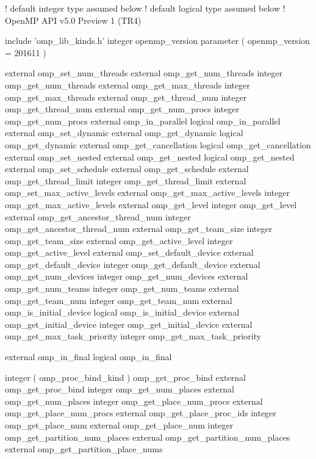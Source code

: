 {\small \begin{codepar}
! default integer type assumed below
! default logical type assumed below
! OpenMP API v5.0 Preview 1 (TR4)

     include 'omp\_lib\_kinds.h'
     integer openmp\_version
     parameter ( openmp\_version = 201611 )

     external omp\_set\_num\_threads
     external omp\_get\_num\_threads
     integer omp\_get\_num\_threads
     external omp\_get\_max\_threads
     integer omp\_get\_max\_threads
     external omp\_get\_thread\_num
     integer omp\_get\_thread\_num
     external omp\_get\_num\_procs
     integer omp\_get\_num\_procs
     external omp\_in\_parallel
     logical omp\_in\_parallel
     external omp\_set\_dynamic
     external omp\_get\_dynamic
     logical omp\_get\_dynamic
     external omp\_get\_cancellation
     logical omp\_get\_cancellation
     external omp\_set\_nested
     external omp\_get\_nested
     logical omp\_get\_nested
     external omp\_set\_schedule
     external omp\_get\_schedule
     external omp\_get\_thread\_limit
     integer omp\_get\_thread\_limit
     external omp\_set\_max\_active\_levels
     external omp\_get\_max\_active\_levels
     integer omp\_get\_max\_active\_levels
     external omp\_get\_level
     integer omp\_get\_level
     external omp\_get\_ancestor\_thread\_num
     integer omp\_get\_ancestor\_thread\_num
     external omp\_get\_team\_size
     integer omp\_get\_team\_size
     external omp\_get\_active\_level
     integer omp\_get\_active\_level
     external omp\_set\_default\_device
     external omp\_get\_default\_device
     integer omp\_get\_default\_device
     external omp\_get\_num\_devices
     integer omp\_get\_num\_devices
     external omp\_get\_num\_teams
     integer omp\_get\_num\_teams
     external omp\_get\_team\_num
     integer omp\_get\_team\_num
     external omp\_is\_initial\_device
     logical omp\_is\_initial\_device
     external omp\_get\_initial\_device
     integer omp\_get\_initial\_device
     external omp\_get\_max\_task\_priority
     integer omp\_get\_max\_task\_priority

     external omp\_in\_final
     logical omp\_in\_final

     integer ( omp\_proc\_bind\_kind ) omp\_get\_proc\_bind
     external omp\_get\_proc\_bind
     integer omp\_get\_num\_places
     external omp\_get\_num\_places
     integer omp\_get\_place\_num\_procs
     external omp\_get\_place\_num\_procs
     external omp\_get\_place\_proc\_ids
     integer omp\_get\_place\_num
     external omp\_get\_place\_num
     integer omp\_get\_partition\_num\_places
     external omp\_get\_partition\_num\_places
     external omp\_get\_partition\_place\_nums
     

\end{codepar}}
